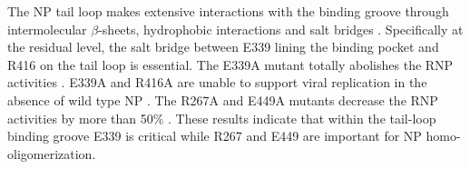 The NP tail loop makes extensive interactions with the binding groove through intermolecular $\beta$-sheets, hydrophobic interactions and salt bridges \citep{1140}. Specifically at the residual level, the salt bridge between E339 lining the binding pocket and R416 on the tail loop is essential. The E339A mutant totally abolishes the RNP activities \citep{1232}. E339A and R416A are unable to support viral replication in the absence of wild type NP \citep{1233}. The R267A and E449A mutants decrease the RNP activities by more than 50\% \citep{1232}. These results indicate that within the tail-loop binding groove E339 is critical while R267 and E449 are important for NP homo-oligomerization.
